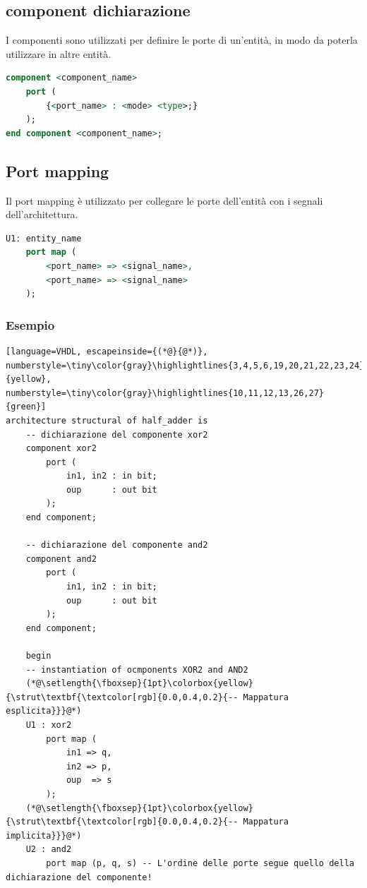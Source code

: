     \subsection{component dichiarazione}
        I componenti sono utilizzati per definire le porte di un'entità, in modo da poterla utilizzare in altre entità.
        \begin{lstlisting}[language=VHDL]
component <component_name>
    port (
        {<port_name> : <mode> <type>;}
    );
end component <component_name>;
        \end{lstlisting}

        
        \subsection{Port mapping}
            Il port mapping è utilizzato per collegare le porte dell'entità con i segnali dell'architettura.
            \begin{lstlisting}[language=VHDL]
U1: entity_name
    port map (
        <port_name> => <signal_name>,
        <port_name> => <signal_name>
    );
            \end{lstlisting}

            \subsubsection{Esempio}
            \begin{lstlisting}[language=VHDL, escapeinside={(*@}{@*)}, numberstyle=\tiny\color{gray}\highlightlines{3,4,5,6,19,20,21,22,23,24}{yellow}, numberstyle=\tiny\color{gray}\highlightlines{10,11,12,13,26,27}{green}]
architecture structural of half_adder is
    -- dichiarazione del componente xor2
    component xor2
        port (
            in1, in2 : in bit;
            oup      : out bit
        );
    end component;

    -- dichiarazione del componente and2
    component and2
        port (
            in1, in2 : in bit;
            oup      : out bit
        );
    end component;

    begin
    -- instantiation of ocmponents XOR2 and AND2
    (*@\setlength{\fboxsep}{1pt}\colorbox{yellow}{\strut\textbf{\textcolor[rgb]{0.0,0.4,0.2}{-- Mappatura esplicita}}}@*)
    U1 : xor2
        port map (
            in1 => q,
            in2 => p,
            oup  => s
        );
    (*@\setlength{\fboxsep}{1pt}\colorbox{yellow}{\strut\textbf{\textcolor[rgb]{0.0,0.4,0.2}{-- Mappatura implicita}}}@*)
    U2 : and2
        port map (p, q, s) -- L'ordine delle porte segue quello della dichiarazione del componente!
            \end{lstlisting}

